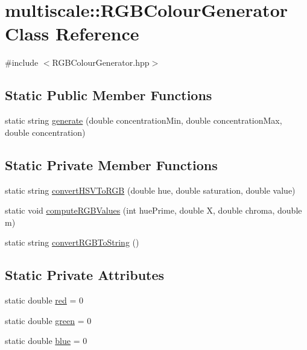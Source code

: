 \hypertarget{classmultiscale_1_1RGBColourGenerator}{\section{multiscale\-:\-:R\-G\-B\-Colour\-Generator Class Reference}
\label{classmultiscale_1_1RGBColourGenerator}
}


{\ttfamily \#include $<$R\-G\-B\-Colour\-Generator.\-hpp$>$}

\subsection*{Static Public Member Functions}
\begin{DoxyCompactItemize}
\item 
static string \hyperlink{classmultiscale_1_1RGBColourGenerator_ab96622fb17f93d1f92a3b8b9fd978725}{generate} (double concentration\-Min, double concentration\-Max, double concentration)
\end{DoxyCompactItemize}
\subsection*{Static Private Member Functions}
\begin{DoxyCompactItemize}
\item 
static string \hyperlink{classmultiscale_1_1RGBColourGenerator_af29401043271ed11f69cdd0ecf52649e}{convert\-H\-S\-V\-To\-R\-G\-B} (double hue, double saturation, double value)
\item 
static void \hyperlink{classmultiscale_1_1RGBColourGenerator_a3c72c2ef3fa50215e73732e324f6f1e1}{compute\-R\-G\-B\-Values} (int hue\-Prime, double X, double chroma, double m)
\item 
static string \hyperlink{classmultiscale_1_1RGBColourGenerator_ab5600e0c10534f0d80511178c43ec507}{convert\-R\-G\-B\-To\-String} ()
\end{DoxyCompactItemize}
\subsection*{Static Private Attributes}
\begin{DoxyCompactItemize}
\item 
static double \hyperlink{classmultiscale_1_1RGBColourGenerator_a8d44923812c8197b193c6fe4885e6028}{red} = 0
\item 
static double \hyperlink{classmultiscale_1_1RGBColourGenerator_a283cedc2943a44f002567f93f32e321b}{green} = 0
\item 
static double \hyperlink{classmultiscale_1_1RGBColourGenerator_a745a07b6c9458793da66adf836e11dcb}{blue} = 0
\end{DoxyCompactItemize}


